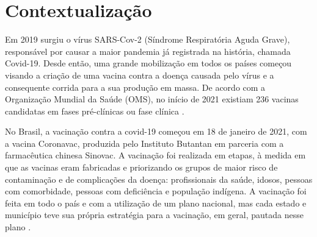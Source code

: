 
\label{Cap:Introducao}





\section{Contextualização}
\label{cap1:Sec:Contextualizacao}
Em 2019 surgiu o vírus SARS-Cov-2 (Síndrome Respiratória Aguda Grave), responsável por causar a maior pandemia já registrada na história, chamada Covid-19. Desde então, uma grande mobilização em todos os países começou visando a criação de uma vacina contra a doença causada pelo vírus e a consequente corrida para a sua produção em massa. De acordo com a Organização Mundial da Saúde (OMS), no início de 2021 existiam 236 vacinas candidatas em fases pré-clínicas ou fase clínica \cite{ministerio2022plano}.


No Brasil, a vacinação contra a covid-19 começou em 18 de janeiro de 2021, com a vacina Coronavac, produzida pelo Instituto Butantan em parceria com a farmacêutica chinesa Sinovac. A vacinação foi realizada em etapas, à medida em que as vacinas eram fabricadas e priorizando os grupos de maior risco de contaminação e de complicações da doença: profissionais da saúde, idosos, pessoas com comorbidade, pessoas com deficiência e população indígena. A vacinação foi feita em todo o país e com a utilização de um plano nacional, mas cada estado e município teve sua própria estratégia para a vacinação, em geral, pautada nesse plano \cite{ministerio2022plano}.


